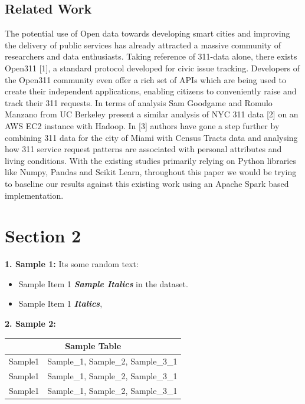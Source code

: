 \documentclass[10pt,twocolumn,letterpaper]{article}
\begin{document}
\subsection{Related Work}
The potential use of Open data towards developing smart cities and improving the delivery of public services has already attracted a massive community of researchers and data enthusiasts. Taking reference of 311-data alone, there exists Open311 [1], a standard protocol developed for civic issue tracking. Developers of the Open311 community even offer a rich set of APIs which are being used to create their independent applications, enabling citizens to conveniently raise and track their 311 requests. In terms of analysis Sam Goodgame and Romulo Manzano from UC Berkeley present a similar analysis of NYC 311 data [2] on an AWS EC2 instance with Hadoop. In [3] authors have gone a step further by combining 311 data for the city of Miami with Census Tracts data and analysing how 311 service request patterns are associated with personal attributes and living conditions. With the existing studies primarily relying on Python libraries like Numpy, Pandas and Scikit Learn, throughout this paper we would be trying to baseline our results against this existing work using an Apache Spark based implementation.

\section{Section 2}

\textbf{1. Sample 1:} Its some random text:
\begin{itemize}
  \item Sample Item 1 \textbf{{\em Sample Italics}} in the dataset.
  \item Sample Item 1 \textbf{{\em Italics}}, 
\end{itemize}

\textbf{2. Sample 2:}\\
\begin{tabular}{ |p{3cm}|p{5cm}|  }
 \hline
 \multicolumn{2}{|c|}{Sample Table} \\
 \hline
 Sample1 &Sample\_1, Sample\_2, Sample\_3\_1\\
 \hline
 Sample1 &Sample\_1, Sample\_2, Sample\_3\_1\\
 \hline
 Sample1 &Sample\_1, Sample\_2, Sample\_3\_1\\
 \hline
\end{tabular}\\
\end{document}
